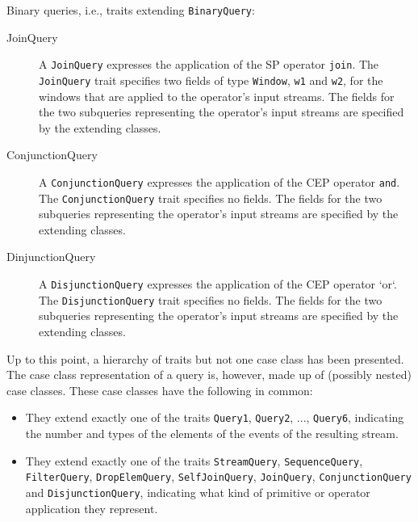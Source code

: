 \documentclass[article, type=bsc, colorback, accentcolor=tud8b, parskip=half, bibliography=totocnumbered]{tudthesis}
\begin{document}
Binary queries, i.e., traits extending \lstinline{BinaryQuery}:

\begin{description}

\item[JoinQuery]
A \lstinline{JoinQuery} expresses the application of the SP operator \lstinline{join}.
The \lstinline{JoinQuery} trait specifies two fields of type \lstinline{Window}, \lstinline{w1} and \lstinline{w2}, for the windows that are applied to the operator's input streams.
The fields for the two subqueries representing the operator's input streams are specified by the extending classes.

\item[ConjunctionQuery]
A \lstinline{ConjunctionQuery} expresses the application of the CEP operator \lstinline{and}.
The \lstinline{ConjunctionQuery} trait specifies no fields.
The fields for the two subqueries representing the operator's input streams are specified by the extending classes.

\item[DinjunctionQuery]
A \lstinline{DisjunctionQuery} expresses the application of the CEP operator `or`.
The \lstinline{DisjunctionQuery} trait specifies no fields.
The fields for the two subqueries representing the operator's input streams are specified by the extending classes.

\end{description}

Up to this point, a hierarchy of traits but not one case class has been presented.
The case class representation of a query is, however, made up of (possibly nested) case classes.
These case classes have the following in common:

\begin{itemize}

\item
They extend exactly one of the traits \lstinline{Query1}, \lstinline{Query2}, ..., \lstinline{Query6}, indicating the number and types of the elements of the events of the resulting stream.

\item
They extend exactly one of the traits \lstinline{StreamQuery}, \lstinline{SequenceQuery}, \lstinline{FilterQuery}, \lstinline{DropElemQuery}, \lstinline{SelfJoinQuery}, \lstinline{JoinQuery}, \lstinline{ConjunctionQuery} and \lstinline{DisjunctionQuery}, indicating what kind of primitive or operator application they represent.

\end{itemize}
\end{document}
